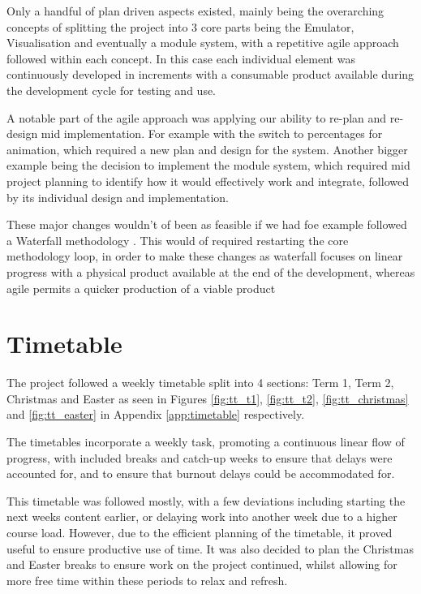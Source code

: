 Only a handful of plan driven aspects existed, mainly being the overarching concepts of splitting the project into 3 core parts being the Emulator, Visualisation and eventually a module system, with a repetitive agile approach followed within each concept. In this case each individual element was continuously developed in increments with a consumable product available during the development cycle for testing and use.

A notable part of the agile approach was applying our ability to re-plan and re-design mid implementation. For example with the switch to percentages for animation, which required a new plan and design for the system. Another bigger example being the decision to implement the module system, which required mid project planning to identify how it would effectively work and integrate, followed by its individual design and implementation.

These major changes wouldn't of been as feasible if we had foe example followed a Waterfall methodology \cite{ganttchartsoftware_2023_waterfall}. This would of required restarting the core methodology loop, in order to make these changes as waterfall focuses on linear progress with a physical product available at the end of the development, whereas agile permits a quicker production of a viable product

\section{Timetable}
The project followed a weekly timetable split into 4 sections: Term 1, Term 2, Christmas and Easter as seen in Figures \ref{fig:tt_t1}, \ref{fig:tt_t2}, \ref{fig:tt_christmas} and \ref{fig:tt_easter} in Appendix \ref{app:timetable} respectively.

The timetables incorporate a weekly task, promoting a continuous linear flow of progress, with included breaks and catch-up weeks to ensure that delays were accounted for, and to ensure that burnout delays could be accommodated for. 

This timetable was followed mostly, with a few deviations including starting the next weeks content earlier, or delaying work into another week due to a higher course load. However, due to the efficient planning of the timetable, it proved useful to ensure productive use of time. It was also decided to plan the Christmas and Easter breaks to ensure work on the project continued, whilst allowing for more free time within these periods to relax and refresh.

